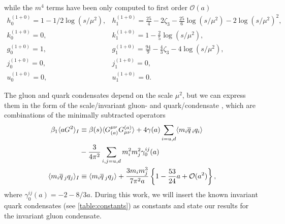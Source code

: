 \documentclass[../../index.tex]{subfiles}
\begin{document}
while the \(m^4\) terms have been only computed to first order
\(\mathcal{O}(a)\)
\begin{equation}
  \begin{array}{ll}
    h_0^{(1+0)}=1-1/2 \log(s/\mu^2), & h_1^{(1+0)}=\frac{25}{4}-2\zeta_3-\frac{25}{6}\log(s/\mu^2)-2 \log(s/\mu^2)^2, \\
    k_0^{(1+0)}=0, & k_1^{(1+0)}=1-\frac{2}{5}\log(s/\mu^2), \\
    g_0^{(1+0)}=1, & g_1^{(1+0)}=\frac{94}{9}-\frac{4}{3}\zeta_3-4 \log(s/\mu^2), \\
    j_0^{(1+0)}=0, & j_1^{(1+0)}=0, \\
    u_0^{(1+0)}=0, & u_1^{(1+0)}=0.
  \end{array}
\end{equation}

The gluon and quark condensates depend on the scale \(\mu^2\), but we can express them
in the form of the scale\-/invariant gluon- and quark\-/condensate
\cite{Spiridonov1988}, which are combinations of the minimally subtracted
operators
\begin{align}
  \beta_1 \langle a G^2 \rangle_I
  &\equiv \beta(s) \langle
    G_{(a)}^{\mu\nu}G_{\mu\nu}^{(a)} \rangle + 4 \gamma(a) \sum_{i=u,d} \langle
    m_i \overline{q}\,_i q_i \rangle \nonumber \\ 
  &- \frac{3}{4\pi^2} \sum_{i,j=u,d} m_i^2m_j^2
    \gamma_0^{ij}(a) \\
  \langle  m_i \overline{q}\,_j q_j \rangle_I
  &\equiv \langle m_i \overline{q}\,_j q_j \rangle
    +\frac{3 m_i m_j^3}{7 \pi^2 a} \left\{ 1 - \frac{53}{24}a + \mathcal{O}(a^2) \right\},
\end{align}
where \(\gamma_0^{ij}(a) = -2 - 8/3 a\). During this work, we will insert the
known invariant quark condensates (see \cref{table:constants}) as constants and
state our results for the invariant gluon condensate.
\end{document}
